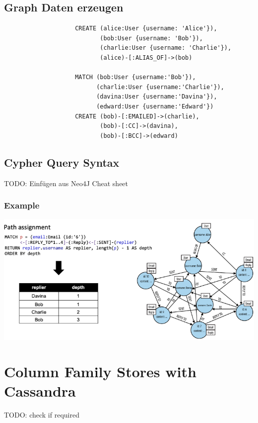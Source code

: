 \documentclass[a4paper, landscape, 8pt]{scrartcl}
\begin{document}
\begin{multicols*}{4}
        \subsection{Graph Daten erzeugen}
        \begin{lstlisting}
                    CREATE (alice:User {username: 'Alice'}),
                           (bob:User {username: 'Bob'}),
                           (charlie:User {username: 'Charlie'}),
                           (alice)-[:ALIAS_OF]->(bob)

                    MATCH (bob:User {username:'Bob'}),
                          (charlie:User {username:'Charlie'}),
                          (davina:User {username:'Davina'}),
                          (edward:User {username:'Edward'})
                    CREATE (bob)-[:EMAILED]->(charlie),
                           (bob)-[:CC]->(davina),
                           (bob)-[:BCC]->(edward)
        \end{lstlisting}

        \subsection{Cypher Query Syntax}
        TODO: Einfügen aus Neo4J Cheat sheet

        \subsubsection{Example}
        \includegraphics[width=\columnwidth]{graphic/13-example-cypher-query}
        
        \section{Column Family Stores {\tiny with Cassandra}}
        TODO: check if required


\end{multicols*}
\end{document}
